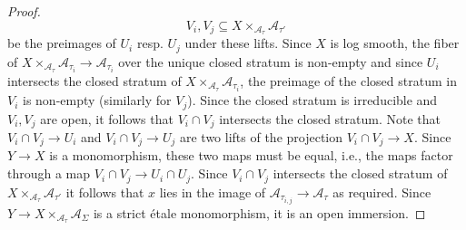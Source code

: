\documentclass[11pt]{amsart}
\theoremstyle{definition}
\theoremstyle{remark}
\begin{document}
\begin{proof}
	$$V_i,V_j\subseteq X\times_{\mathcal{A}_{\tau}}\mathcal{A}_{\tau'}$$
	be the preimages of $U_i$ resp. $U_j$ under these lifts. Since $X$ is log smooth, the fiber of $X\times_{\mathcal{A}_{\tau}}\mathcal{A}_{\tau_i}\to \mathcal{A}_{\tau_i}$
	over the unique closed stratum is non-empty and since $U_i$ intersects the closed stratum of $X\times_{\mathcal{A}_{\tau}}\mathcal{A}_{\tau_i}$, the preimage of the closed stratum in
	$V_i$ is non-empty (similarly for $V_j$). Since the closed stratum is irreducible and $V_i,V_j$ are open, it follows that
	$V_i\cap V_j$ intersects the closed stratum. Note that $V_i\cap V_j\to U_i$ and $V_i\cap V_j\to U_j$ are two lifts of the projection
	$V_i\cap V_j\to X$. Since $Y\to X$ is a monomorphism, these two maps must be equal, i.e., the maps factor through a map
	$V_i\cap V_j\to U_i\cap U_j$. Since $V_i\cap V_j$ intersects the closed stratum of $X\times_{\mathcal{A}_{\tau}}\mathcal{A}_{\tau'}$
	it follows that $x$ lies in the image of $\mathcal{A}_{\tau_{i,j}}\to \mathcal{A}_{\tau}$ as required. Since
	$Y\to X\times_{\mathcal{A}_{\tau}}\mathcal{A}_{\Sigma}$ is a
	strict étale monomorphism, it is an open immersion.
\end{proof}
\end{document}
